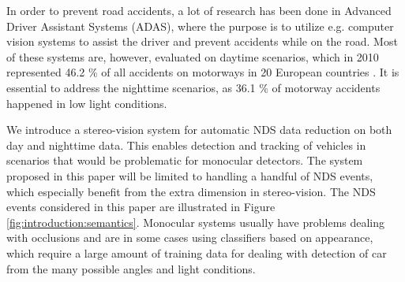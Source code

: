 In order to prevent road accidents, a lot of research has been done in Advanced Driver Assistant Systems (ADAS), where the purpose is to utilize e.g. computer vision systems to assist the driver and prevent accidents while on the road. Most of these systems are, however, evaluated on daytime scenarios, which in 2010 represented 46.2 \% of all accidents on motorways in 20 European countries \cite{euTrafficStats}.
It is essential to address the nighttime scenarios, as 36.1 \% of motorway accidents happened in low light conditions.

We introduce a stereo-vision system for automatic NDS data reduction on both day and nighttime data. This enables detection and tracking of vehicles in scenarios that would be problematic for monocular detectors. The system proposed in this paper will be limited to handling a handful of NDS events, which especially benefit from the extra dimension in stereo-vision. The NDS events considered in this paper are illustrated in Figure \ref{fig:introduction:semantics}. Monocular systems usually have problems dealing with occlusions and are in some cases using classifiers based on appearance, which require a large amount of training data for dealing with detection of car from the many possible angles and light conditions. 

